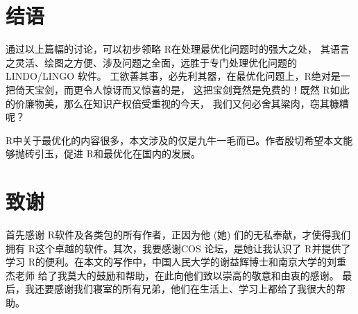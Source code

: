 \documentclass{article}
\newcommand{\R}{\textsf{R}}
\begin{document}
 \section{结语}
 通过以上篇幅的讨论，可以初步领略 \R 在处理最优化问题时的强大之处，
 其语言之灵活、绘图之方便、涉及问题之全面，远胜于专门处理优化问题的 LINDO/LINGO 软件。
 工欲善其事，必先利其器，在最优化问题上，\R 绝对是一把倚天宝剑，而更令人惊讶而又惊喜的是，
 这把宝剑竟然是免费的！既然 \R 如此的价廉物美，那么在知识产权倍受重视的今天，
 我们又何必舍其粱肉，窃其糠糟呢？
 
 
 \R 中关于最优化的内容很多，本文涉及的仅是九牛一毛而已。作者殷切希望本文能够抛砖引玉，促进 \R 和最优化在国内的发展。

\section*{致谢}
首先感谢 \R 软件及各类包的所有作者，正因为他 (她) 们的无私奉献，才使得我们拥有 \R 这个卓越的软件。其次，我要感谢COS 论坛，是她让我认识了 \R 并提供了学习 \R 的便利。在本文的写作中，中国人民大学的谢益辉博士和南京大学的刘重杰老师
给了我莫大的鼓励和帮助，在此向他们致以崇高的敬意和由衷的感谢。
最后，我还要感谢我们寝室的所有兄弟，他们在生活上、学习上都给了我很大的帮助。
\end{document}

